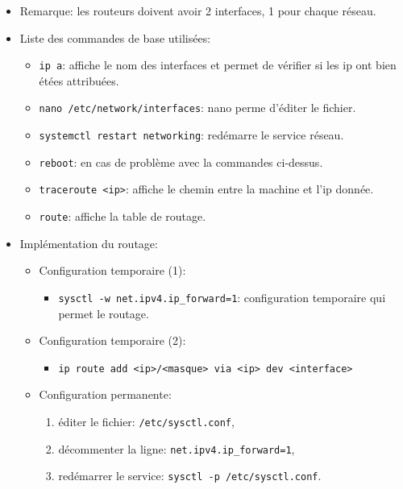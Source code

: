 \documentclass[a4paper]{article}
\begin{document}
\begin{itemize}
\item Remarque: les routeurs doivent avoir 2 interfaces, 1 pour chaque réseau.





\item Liste des commandes de base utilisées:
\begin{itemize}
    \item \texttt{ip a}: affiche le nom des interfaces et permet de vérifier si les ip ont bien étées attribuées.
    \item \texttt{nano /etc/network/interfaces}: nano perme d'éditer le fichier.
    \item \texttt{systemctl restart networking}: redémarre le service réseau.
    \item \texttt{reboot}: en cas de problème avec la commandes ci-dessus.
    \item \texttt{traceroute <ip>}: affiche le chemin entre la machine et l'ip donnée.
    \item \texttt{route}: affiche la table de routage.
\end{itemize}





\item Implémentation du routage:
\begin{itemize}
    \item Configuration temporaire (1):
    \begin{itemize}
        \item \texttt{sysctl -w net.ipv4.ip\_forward=1}: configuration temporaire qui permet le routage.
    \end{itemize}
    \item Configuration temporaire (2):
    \begin{itemize}
        \item \texttt{ip route add <ip>/<masque> via <ip> dev <interface>}
    \end{itemize}
    \item Configuration permanente:
    \begin{enumerate}
        \item éditer le fichier: \texttt{/etc/sysctl.conf},
        \item décommenter la ligne: \texttt{net.ipv4.ip\_forward=1},
        \item redémarrer le service: \texttt{sysctl -p /etc/sysctl.conf}.
    \end{enumerate}
\end{itemize}






\end{itemize}
\end{document}
